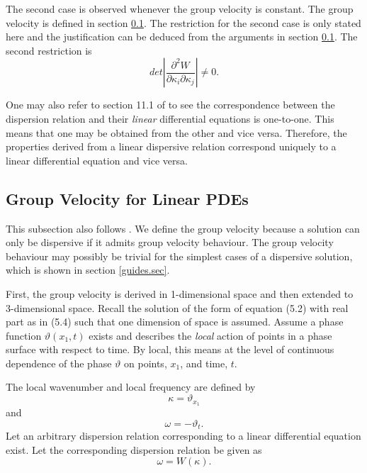 \documentclass[12pt]{article}
\theoremstyle{definition}
\numberwithin{equation}{section}
\begin{document}
{The second case is observed whenever the group velocity is constant. The group velocity is defined in section \ref{groupvelocity}. The restriction for the second case is only stated here and the justification can be deduced from the arguments in section \ref{groupvelocity}. The second restriction is
\begin{equation}
det\left|\frac{\partial^2 W}{\partial\kappa_i\partial\kappa_j}\right|\neq 0.
\label{restriction2.eqn}
\end{equation}

One may also refer to section 11.1 of \cite{Whitham} to see the correspondence between the dispersion relation and their \textit{linear} differential equations is one-to-one. This means that one may be obtained from the other and vice versa. Therefore, the properties derived from a linear dispersive relation correspond uniquely to a linear differential equation and vice versa.
\subsection{Group Velocity for Linear PDEs}
\label{groupvelocity}
This subsection also follows \cite{Whitham}. We define the group velocity because a solution can only be dispersive if it admits group velocity behaviour. The group velocity behaviour may possibly be trivial for the simplest cases of a dispersive solution, which is shown in section \ref{guides.sec}.

First, the group velocity is derived in 1-dimensional space and then extended to 3-dimensional space. Recall the solution of the form of equation (5.2) with real part as in (5.4) such that one dimension of space is assumed. Assume a phase function $\vartheta(x_1,t)$ exists and describes the \textit{local} action of points in a phase surface with respect to time. By local, this means at the level of continuous dependence of the phase $\vartheta$ on points, $x_1$, and time, $t$.

The local wavenumber and local frequency are defined by
\begin{equation}
\kappa=\vartheta_{x_1}
\label{localphase1.eqn}
\end{equation}
and
\begin{equation}
\omega=-\vartheta_t.
\label{localphase2.eqn}
\end{equation}
Let an arbitrary dispersion relation corresponding to a linear differential equation exist. Let the corresponding dispersion relation be given as
$$\omega=W(\kappa).$$

}
\end{document}
